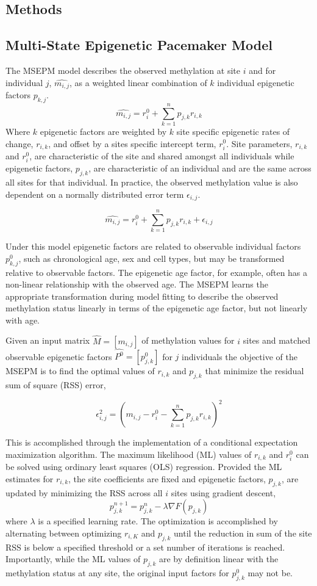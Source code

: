 \documentclass{article}
\begin{document}
{\begin{linenumbers}
\section{Methods}\label{sec2}

\subsection{Multi-State Epigenetic Pacemaker Model}

The MSEPM model describes the observed methylation at site $i$ and for individual $j$, $\hat{m_{i,j}}$, 
as a weighted linear combination of $k$ individual epigenetic factors $p_{k,j}$. 
$$\hat{m_{i,j}} = r^0_i + \sum^n_{k=1} p_{j,k} r_{i,k}$$ Where $k$ epigenetic factors are weighted by $k$ site specific 
epigenetic rates of change, $r_{i,k}$, and offset by a sites specific intercept term, $r^0_i$. Site parameters,
 $r_{i,k}$ and $r^0_i$, 
are characteristic of the site and shared amongst all individuals while epigenetic factors, $p_{j,k}$, are characteristic 
of an individual and are the same across all sites for that individual. In practice, 
the observed methylation value is also dependent on a normally distributed error term 
$\epsilon_{i,j}$.

$$\hat{m_{i,j}} = r^0_i + \sum^n_{k=1} p_{j,k} r_{i,k} + \epsilon_{i,j}$$

Under this model epigenetic factors are related to observable individual 
factors $p_{k,j}^0$, such as chronological age, sex and cell types, but may be transformed relative to observable factors. 
The epigenetic age factor, for example, often has a non-linear relationship with the observed age\cite{Snir2019-ii}. 
The MSEPM learns the appropriate transformation during model fitting to describe the observed methylation status 
linearly in terms of the epigenetic age factor, but not linearly with age.

Given an input matrix $\hat{M} = [m_{i,j}]$ of methylation values for $i$ sites and matched observable epigenetic factors 
$\hat{P^0} = [p_{j,k}^0]$ for $j$ individuals the objective of the MSEPM is to find the optimal values of 
$r_{i,k}$ and $p_{j,k}$ that minimize the  residual sum of square (RSS) error,

$$\epsilon_{i,j}^2 = (m_{i,j} - r^0_{i} - \sum^n_{k=1} p_{j,k} r_{i,k})^2$$ 

This is accomplished through the implementation of a conditional expectation maximization algorithm. The maximum likelihood (ML) values of 
$r_{i,k}$ and $r^0_i$ can
be solved using ordinary least squares (OLS) regression. Provided the ML estimates for $r_{i,k}$, the site coefficients are fixed and 
epigenetic factors, $p_{j,k}$, are  updated by minimizing the RSS across all $i$ sites using 
gradient descent, $$p_{j,k}^{n+1} = p_{j,k}^n - \lambda \nabla F(p_{j,k})$$ where $\lambda$ is a specified learning rate. 
The optimization is accomplished by alternating between optimizing $r_{i,K}$ 
and $p_{j,k}$ until the reduction in sum of the site RSS is below a specified threshold or a set number 
of iterations is reached. Importantly, while the ML values of $p_{j,k}$ are 
by definition linear with the methylation status at any site, the original input factors for $p_{j,k}^0$ may not be. 


\end{linenumbers}}
\end{document}
